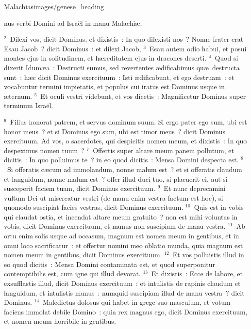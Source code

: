 {Malachias}{images/genese_heading}


\bchapter
{}nus verbi Domini ad Isra\"el in manu Malachi\ae .


${}^{2}$~Dilexi vos, dicit Dominus, et dixistis~: In quo dilexisti nos~? Nonne frater erat Esau Jacob~? dicit Dominus~: et dilexi Jacob,
${}^{3}$~Esau autem odio habui, et posui montes ejus in solitudinem, et h\ae reditatem ejus in dracones deserti.
${}^{4}$~Quod si dixerit Idum\ae a~: Destructi sumus, sed revertentes \ae dificabimus qu\ae\ destructa sunt~: h\ae c dicit Dominus exercituum~: Isti \ae dificabunt, et ego destruam~: et vocabuntur termini impietatis, et populus cui iratus est Dominus usque in \ae ternum.
${}^{5}$~Et oculi vestri videbunt, et vos dicetis~: Magnificetur Dominus super terminum Isra\"el.


${}^{6}$~Filius honorat patrem, et servus dominum suum. Si ergo pater ego sum, ubi est honor meus~? et si Dominus ego sum, ubi est timor meus~? dicit Dominus exercituum. Ad vos, o sacerdotes, qui despicitis nomen meum, et dixistis~: In quo despeximus nomen tuum~?
${}^{7}$~Offertis super altare meum panem pollutum, et dicitis~: In quo polluimus te~? in eo quod dicitis~: Mensa Domini despecta est.
${}^{8}$~Si offeratis c\ae cum ad immolandum, nonne malum est~? et si offeratis claudum et languidum, nonne malum est~? offer illud duci tuo, si placuerit ei, aut si susceperit faciem tuam, dicit Dominus exercituum.
${}^{9}$~Et nunc deprecamini vultum Dei ut misereatur vestri (de manu enim vestra factum est hoc), si quomodo suscipiat facies vestras, dicit Dominus exercituum.
${}^{10}$~Quis est in vobis qui claudat ostia, et incendat altare meum gratuito~? non est mihi voluntas in vobis, dicit Dominus exercituum, et munus non suscipiam de manu vestra.
${}^{11}$~Ab ortu enim solis usque ad occasum, magnum est nomen meum in gentibus, et in omni loco sacrificatur~: et offertur nomini meo oblatio munda, quia magnum est nomen meum in gentibus, dicit Dominus exercituum.
${}^{12}$~Et vos polluistis illud in eo quod dicitis~: Mensa Domini contaminata est, et quod superponitur contemptibilis est, cum igne qui illud devorat.
${}^{13}$~Et dixistis~: Ecce de labore, et exsufflastis illud, dicit Dominus exercituum~: et intulistis de rapinis claudum et languidum, et intulistis munus~: numquid suscipiam illud de manu vestra~? dicit Dominus.
${}^{14}$~Maledictus dolosus qui habet in grege suo masculum, et votum faciens immolat debile Domino~: quia rex magnus ego, dicit Dominus exercituum, et nomen meum horribile in gentibus.

